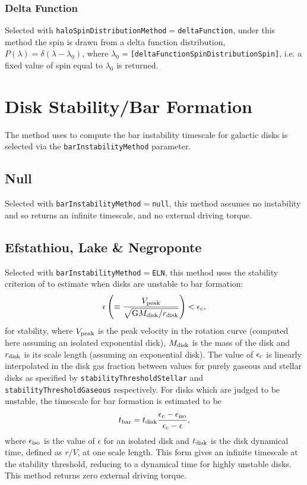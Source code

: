 \subsubsection{Delta Function}

Selected with {\tt haloSpinDistributionMethod}$=${\tt deltaFunction}, under this method the spin is drawn from a delta function distribution, $P(\lambda) = \delta(\lambda-\lambda_0)$, where $\lambda_0=${\tt [deltaFunctionSpinDistributionSpin]}, i.e. a fixed value of spin equal to $\lambda_0$ is returned.

\section{Disk Stability/Bar Formation}\label{sec:DiskStability}

The method uses to compute the bar instability timescale for galactic disks is selected via the {\tt barInstabilityMethod} parameter.

\subsection{Null}

Selected with {\tt barInstabilityMethod}$=${\tt null}, this method assumes no instability and so returns an infinite timescale, and no external driving torque.

\subsection{Efstathiou, Lake \& Negroponte}

Selected with {\tt barInstabilityMethod}$=${\tt ELN}, this method uses the stability criterion of \cite{efstathiou_stability_1982} to estimate when disks are unstable to bar formation:
\begin{equation}
 \epsilon \left( \equiv {V_{\rm peak} \over \sqrt{\G M_{\rm disk}/r_{\rm disk}}} \right) < \epsilon_{\rm c},
\end{equation}
for stability, where $V_{\rm peak}$ is the peak velocity in the rotation curve (computed here assuming an isolated exponential disk), $M_{\rm disk}$ is the mass of the disk and $r_{\rm disk}$ is its scale length (assuming an exponential disk). The value of $\epsilon_{\rm c}$ is linearly interpolated in the disk gas fraction between values for purely gaseous and stellar disks as specified by {\tt stabilityThresholdStellar} and {\tt stabilityThresholdGaseous} respectively. For disks which are judged to be unstable, the timescale for bar formation is estimated to be
\begin{equation}
 t_{\rm bar} = t_{\rm disk} {\epsilon_{\rm c} - \epsilon_{\rm iso} \over \epsilon_{\rm c} - \epsilon},
\end{equation}
where $\epsilon_{\rm iso}$ is the value of $\epsilon$ for an isolated disk and $t_{\rm disk}$ is the disk dynamical time, defined as $r/V$, at one scale length. This form gives an infinite timescale at the stability threshold, reducing to a dynamical time for highly unstable disks. This method returns zero external driving torque.

